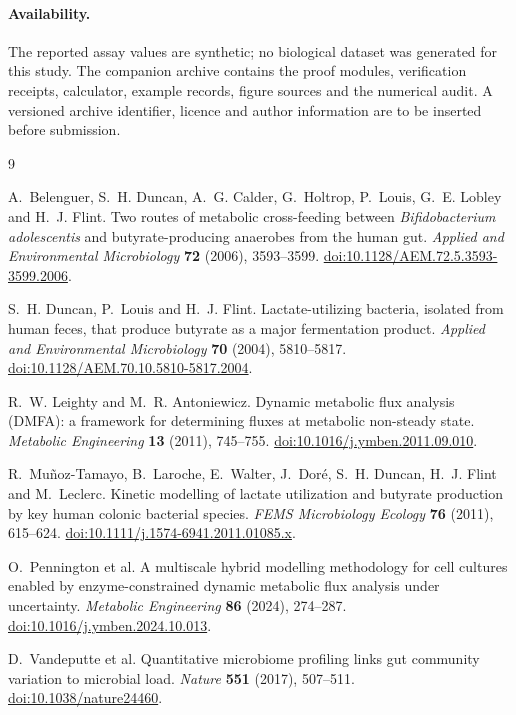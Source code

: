 \documentclass[11pt]{article}
\theoremstyle{plain}
\theoremstyle{definition}
\theoremstyle{remark}
\begin{document}
\paragraph{Availability.} The reported assay values are synthetic; no
biological dataset was generated for this study. The companion archive
contains the proof modules, verification receipts, calculator, example
records, figure sources and the numerical audit. A versioned archive
identifier, licence and author information are to be inserted before
submission.

\begin{thebibliography}{9}

A.~Belenguer, S.~H. Duncan, A.~G. Calder, G.~Holtrop, P.~Louis, G.~E. Lobley
and H.~J. Flint.
Two routes of metabolic cross-feeding between \emph{Bifidobacterium
adolescentis} and butyrate-producing anaerobes from the human gut.
\emph{Applied and Environmental Microbiology} \textbf{72} (2006), 3593--3599.
\href{https://doi.org/10.1128/AEM.72.5.3593-3599.2006}
{doi:10.1128/AEM.72.5.3593-3599.2006}.

S.~H. Duncan, P.~Louis and H.~J. Flint.
Lactate-utilizing bacteria, isolated from human feces, that produce butyrate
as a major fermentation product.
\emph{Applied and Environmental Microbiology} \textbf{70} (2004), 5810--5817.
\href{https://doi.org/10.1128/AEM.70.10.5810-5817.2004}
{doi:10.1128/AEM.70.10.5810-5817.2004}.

R.~W. Leighty and M.~R. Antoniewicz.
Dynamic metabolic flux analysis (DMFA): a framework for determining fluxes at
metabolic non-steady state.
\emph{Metabolic Engineering} \textbf{13} (2011), 745--755.
\href{https://doi.org/10.1016/j.ymben.2011.09.010}
{doi:10.1016/j.ymben.2011.09.010}.

R.~Muñoz-Tamayo, B.~Laroche, E.~Walter, J.~Doré, S.~H. Duncan, H.~J. Flint and
M.~Leclerc.
Kinetic modelling of lactate utilization and butyrate production by key human
colonic bacterial species.
\emph{FEMS Microbiology Ecology} \textbf{76} (2011), 615--624.
\href{https://doi.org/10.1111/j.1574-6941.2011.01085.x}
{doi:10.1111/j.1574-6941.2011.01085.x}.

O.~Pennington et al.
A multiscale hybrid modelling methodology for cell cultures enabled by
enzyme-constrained dynamic metabolic flux analysis under uncertainty.
\emph{Metabolic Engineering} \textbf{86} (2024), 274--287.
\href{https://doi.org/10.1016/j.ymben.2024.10.013}
{doi:10.1016/j.ymben.2024.10.013}.

D.~Vandeputte et al.
Quantitative microbiome profiling links gut community variation to microbial
load.
\emph{Nature} \textbf{551} (2017), 507--511.
\href{https://doi.org/10.1038/nature24460}{doi:10.1038/nature24460}.

\end{thebibliography}
\end{document}
